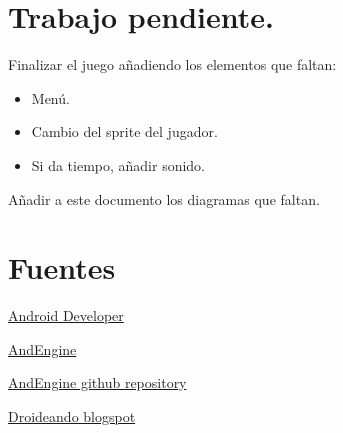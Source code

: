 \documentclass[12 pt, a4paper, twoside]{article}
\begin{document}
\section{Trabajo pendiente.}

Finalizar el juego añadiendo los elementos que faltan:

\begin{itemize}
  \item Menú.
  \item Cambio del sprite del jugador.
  \item Si da tiempo, añadir sonido.
\end{itemize}

Añadir a este documento los diagramas que faltan.


\section{Fuentes}
\href{http://developer.android.com/index.html}{Android Developer}

\href{http://www.andengine.org/}{AndEngine}

\href{https://github.com/nicolasgramlich/AndEngine}{AndEngine github repository}

\href{http://droideando.blogspot.com.es}{Droideando blogspot}
\end{document}
